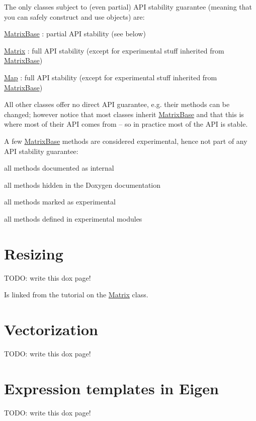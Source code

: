 The only classes subject to (even partial) A\+PI stability guarantee (meaning that you can safely construct and use objects) are\+: \begin{DoxyItemize}
\item \hyperlink{group___core___module_class_eigen_1_1_matrix_base}{Matrix\+Base} \+: partial A\+PI stability (see below) \item \hyperlink{group___core___module_class_eigen_1_1_matrix}{Matrix} \+: full A\+PI stability (except for experimental stuff inherited from \hyperlink{group___core___module_class_eigen_1_1_matrix_base}{Matrix\+Base}) \item \hyperlink{group___core___module_class_eigen_1_1_map}{Map} \+: full A\+PI stability (except for experimental stuff inherited from \hyperlink{group___core___module_class_eigen_1_1_matrix_base}{Matrix\+Base})\end{DoxyItemize}
All other classes offer no direct A\+PI guarantee, e.\+g. their methods can be changed; however notice that most classes inherit \hyperlink{group___core___module_class_eigen_1_1_matrix_base}{Matrix\+Base} and that this is where most of their A\+PI comes from -- so in practice most of the A\+PI is stable.

A few \hyperlink{group___core___module_class_eigen_1_1_matrix_base}{Matrix\+Base} methods are considered experimental, hence not part of any A\+PI stability guarantee\+: \begin{DoxyItemize}
\item all methods documented as internal \item all methods hidden in the Doxygen documentation \item all methods marked as experimental \item all methods defined in experimental modules \end{DoxyItemize}
\hypertarget{TopicResizing}{}\section{Resizing}\label{TopicResizing}
T\+O\+DO\+: write this dox page!

Is linked from the tutorial on the \hyperlink{group___core___module_class_eigen_1_1_matrix}{Matrix} class. \hypertarget{TopicVectorization}{}\section{Vectorization}\label{TopicVectorization}
T\+O\+DO\+: write this dox page! \hypertarget{TopicEigenExpressionTemplates}{}\section{Expression templates in Eigen}\label{TopicEigenExpressionTemplates}
T\+O\+DO\+: write this dox page!

